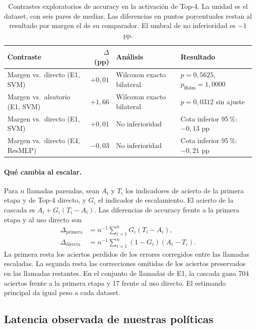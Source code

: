 \documentclass[a4paper,fleqn]{cas-sc}
\begin{document}
\begin{table}[pos=htbp]
\centering
\caption{Contrastes exploratorios de accuracy en la activación de Top-4. La unidad es el dataset, con seis pares de medias. Las diferencias en puntos porcentuales restan al resultado por margen el de su comparador. El umbral de no inferioridad es $-1$ pp.}
\label{tab:contrastes-margen}
\small
\setlength{\tabcolsep}{4pt}
\begin{tabular}{@{}p{}rp{}p{}@{}}
\toprule
Contraste & $\Delta$ (pp) & Análisis & Resultado \\
\midrule
Margen vs.\ directo (E1, SVM) & $+0{,}01$ & Wilcoxon exacto bilateral & $p=0{,}5625$, $p_{\mathrm{Holm}}=1{,}0000$ \\
\addlinespace
Margen vs.\ aleatorio (E1, SVM) & $+1{,}66$ & Wilcoxon exacto bilateral & $p=0{,}0312$ sin ajuste \\
\addlinespace
Margen vs.\ directo (E1, SVM) & $+0{,}01$ & No inferioridad & Cota inferior 95\,\%: $-0{,}13$ pp \\
\addlinespace
Margen vs.\ directo (E4, ResMLP) & $-0{,}03$ & No inferioridad & Cota inferior 95\,\%: $-0{,}21$ pp \\
\bottomrule
\end{tabular}
\end{table}
\FloatBarrier

\paragraph{Qué cambia al escalar.}
Para $n$ llamadas pareadas, sean $A_i$ y $T_i$ los indicadores de acierto de la primera etapa y de Top-4 directo, y $G_i$ el indicador de escalamiento. El acierto de la cascada es $A_i+G_i(T_i-A_i)$. Las diferencias de accuracy frente a la primera etapa y al uso directo son
\begin{align}
 \Delta_{\mathrm{primera}} &= n^{-1}\sum_{i=1}^{n}G_i(T_i-A_i),\\
 \Delta_{\mathrm{directa}} &= n^{-1}\sum_{i=1}^{n}(1-G_i)(A_i-T_i).
\end{align}
La primera resta los aciertos perdidos de los errores corregidos entre las llamadas escaladas. La segunda resta las correcciones omitidas de los aciertos preservados en las llamadas restantes. En el conjunto de llamadas de E1, la cascada gana 704 aciertos frente a la primera etapa y 17 frente al uso directo. El estimando principal da igual peso a cada dataset.

\subsection{Latencia observada de nuestras políticas}
\end{document}
